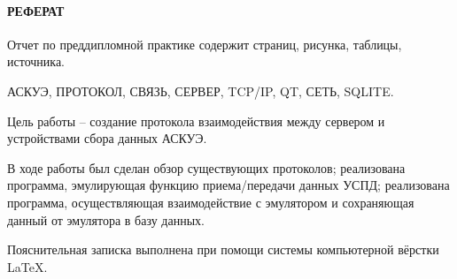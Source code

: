\newpage
{}
\paragraph*{\hfill РЕФЕРАТ \hfill}
Отчет по преддипломной практике содержит  страниц,  рисунка,   таблицы,  источника. %

АСКУЭ, ПРОТОКОЛ, СВЯЗЬ, СЕРВЕР, TCP/IP, QT, СЕТЬ, SQLITE.

Цель работы -- создание протокола взаимодействия между сервером и устройствами сбора данных АСКУЭ.

В ходе работы был сделан обзор существующих протоколов; реализована программа, эмулирующая функцию приема/передачи данных УСПД; реализована программа, осуществляющая взаимодействие с эмулятором и сохраняющая данный от эмулятора в базу данных.

Пояснительная записка выполнена при помощи системы компьютерной вёрстки \LaTeX.
